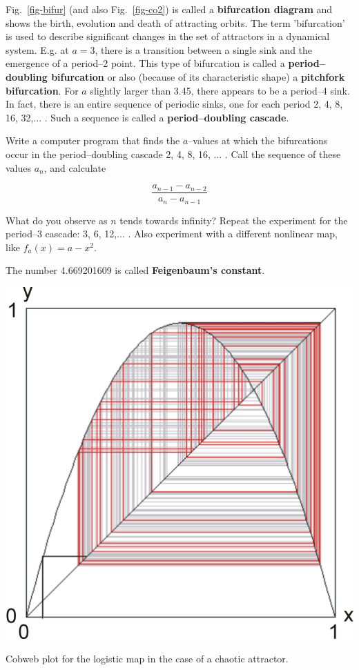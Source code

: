Fig.~\ref{fig-bifur} (and also Fig.~\ref{fig-co2}) is called a \textbf{bifurcation diagram} and shows the birth, evolution and death of attracting orbits. The term 'bifurcation' is used to describe significant changes in the set of attractors in a dynamical system. E.g. at $a=3$, there is a transition between a single sink and the emergence of a period--2 point. This type of bifurcation is called a \textbf{period--doubling bifurcation} or also (because of its characteristic shape) a \textbf{pitchfork bifurcation}. For $a$ slightly larger than 3.45, there appears to be a period--4 sink. In fact, there is an entire sequence of periodic sinks, one for each period 2, 4, 8, 16, 32,... . Such a sequence is called a \textbf{period--doubling cascade}.


\begin{exer}
Write a computer program that finds the $a$--values at which the bifurcations occur in the period--doubling cascade 2, 4, 8, 16, ... . Call the sequence of these values $a_n$, and calculate

$$\frac{a_{n-1} - a_{n-2}}{a_{n} - a_{n-1}}$$

What do you observe as $n$ tends towards infinity? Repeat the experiment for the period--3 cascade: 3, 6, 12,... . Also experiment with a different nonlinear map, like $f_a(x)=a-x^2$.

The number 4.669201609 is called \textbf{Feigenbaum's constant}.
\end{exer}

\begin{marginfigure}
\centering
\includegraphics{dynamic/figures/cobweb3}
\caption{Cobweb plot for the logistic map in the case of a chaotic attractor.}
\label{fig-cobweb3}
\end{marginfigure}

